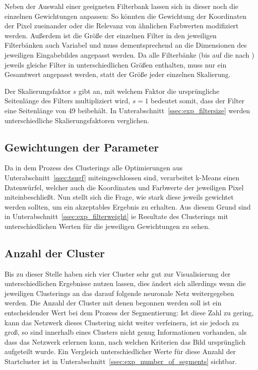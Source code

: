 Neben der Auswahl einer geeigneten Filterbank lassen sich in dieser noch die einzelnen Gewichtungen anpassen: So könnten \zB die Gewichtung der Koordinaten der Pixel zueinander oder die Relevanz von ähnlichen Farbwerten modifiziert werden. Außerdem ist die Größe der einzelnen Filter in den jeweiligen Filterbänken auch Variabel und muss dementsprechend an die Dimensionen des jeweiligen Eingabebildes angepasst werden. Da alle Filterbänke (bis auf die nach \cite{jain_91}) jeweils gleiche Filter in unterschiedlichen Größen enthalten, muss nur ein Gesamtwert angepasst werden, statt der Größe jeder einzelnen Skalierung. 

Der Skalierungsfaktor $s$ gibt an, mit welchem Faktor die ursprüngliche Seitenlänge des Filters multipliziert wird, $s=1$ bedeutet somit, dass der Filter eine Seitenlänge von \SI{49}{\pixel} beibehält. In Unterabschnitt~\ref{ssec:exp_filtersize} werden unterschiedliche Skalierungsfaktoren verglichen.

\subsection{Gewichtungen der Parameter}
\label{ssec:initialization_filterweight}

Da in dem Prozess des Clusterings alle Optimierungen aus Unterabschnitt~\ref{ssec:tsugf} miteingeschlossen sind, verarbeitet k-Means einen Datenwürfel, welcher auch die Koordinaten und Farbwerte der jeweiligen Pixel miteinbeschließt. Nun stellt sich die Frage, wie stark diese jeweils gewichtet werden sollten, um ein akzeptables Ergebnis zu erhalten. Aus diesem Grund sind in Unterabschnitt~\ref{ssec:exp_filterweight} ie Resultate des Clusterings mit unterschiedlichen Werten für die jeweiligen Gewichtungen zu sehen.

\subsection{Anzahl der Cluster}
\label{ssec:initialization_number_of_segments}

Bis zu dieser Stelle haben sich vier Cluster sehr gut zur Visualisierung der unterschiedlichen Ergebnisse nutzen lassen, dies ändert sich allerdings wenn die jeweiligen Clusterings an das darauf folgende neuronale Netz weitergegeben werden. Die Anzahl der Cluster mit denen begonnen werden soll ist ein entscheidender Wert bei dem Prozess der Segmentierung: Ist diese Zahl zu gering, kann das Netzwerk dieses Clustering nicht weiter verfeinern, ist sie jedoch zu groß, so sind innerhalb eines Clusters nicht genug Informationen vorhanden, als dass das Netzwerk erlernen kann, nach welchen Kriterien das Bild ursprünglich aufgeteilt wurde. Ein Vergleich unterschiedlicher Werte für diese Anzahl der Startcluster ist in Unterabschnitt~\ref{ssec:exp_number_of_segments} sichtbar.

